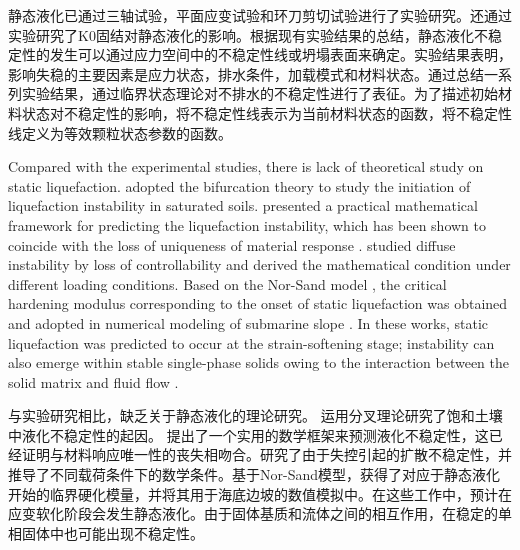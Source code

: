 \begin{ParaColumn}
    \switchcolumn

    静态液化已通过三轴试验\citep{Sladen1985, Lade1990,Yamamuro1997,Doanh1997}，平面应变试验\citep{Chu2008}和环刀剪切试验\citep{Liu2011}进行了实验研究。还通过实验研究了K0固结对静态液化的影响\citep{Fourie2005, Chu2008}。根据现有实验结果的总结，静态液化不稳定性的发生可以通过应力空间中的不稳定性线\citep{Lade1990}或坍塌表面\citep{Sladen1985}来确定。实验结果\citep{Daouadji2010,Wanatowski2012}表明，影响失稳的主要因素是应力状态，排水条件，加载模式和材料状态。通过总结一系列实验结果，通过临界状态理论对不排水的不稳定性进行了表征\citep{Rahman2011,Bedin2012}。为了描述初始材料状态对不稳定性的影响，\citet{Yang2002}将不稳定性线表示为当前材料状态的函数，\citet{Rahman2011}将不稳定性线定义为等效颗粒状态参数的函数。

    \switchcolumn*

    Compared with the experimental studies, there is lack of theoretical study on static liquefaction. \citet{Borja2006} adopted the bifurcation theory to study the initiation of liquefaction instability in saturated soils. \citet{Andrade2009} presented a practical mathematical framework for predicting the liquefaction instability, which has been shown to coincide with the loss of uniqueness of material response \citep{Nova1994}. \citet{Buscarnera2011} studied diffuse instability by loss of controllability and derived the mathematical condition under different loading conditions. Based on the Nor-Sand model \citep{Jefferies1993, Andrade2008}, the critical hardening modulus corresponding to the onset of static liquefaction was obtained and adopted in numerical modeling of submarine slope \citep{Ellison2009}. In these works, static liquefaction was predicted to occur at the strain-softening stage; instability can also emerge within stable single-phase solids owing to the interaction between the solid matrix and fluid flow \citep{Bardet2002}.

    \switchcolumn

    与实验研究相比，缺乏关于静态液化的理论研究。 \citet{Borja2006}运用分叉理论研究了饱和土壤中液化不稳定性的起因。 \citet{Andrade2009}提出了一个实用的数学框架来预测液化不稳定性，这已经证明与材料响应唯一性的丧失相吻合\citep{Nova1994}。\citet{Buscarnera2011}研究了由于失控引起的扩散不稳定性，并推导了不同载荷条件下的数学条件。基于Nor-Sand模型\citep{Jefferies1993, Andrade2008}，获得了对应于静态液化开始的临界硬化模量，并将其用于海底边坡的数值模拟中\citep{Ellison2009}。在这些工作中，预计在应变软化阶段会发生静态液化。由于固体基质和流体之间的相互作用，在稳定的单相固体中也可能出现不稳定性\citep{Bardet2002}。


\end{ParaColumn}
